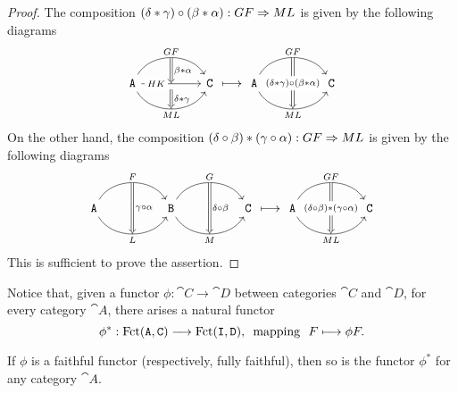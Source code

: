 \begin{proof}
The composition \((\delta * \gamma) \circ (\beta * \alpha): GF \Rightarrow ML\) is
given by the following diagrams
\[
\begin{tikzcd}
\cat A \ar[rr, bend left=60, "GF"{name=GF}]
\ar[rr, "HK"{description, near start}, ""'{name=HK}]
\ar[rr, "ML"'{name=ML}, bend right=60]
& &\cat C
\ar[Rightarrow, "\beta * \alpha", from=GF, to=HK]
\ar[Rightarrow, "\delta* \gamma", from=HK, to=ML]
\end{tikzcd}
\longmapsto
\begin{tikzcd}
\cat A \ar[rr, bend left=60, "GF"{name=GF}]
\ar[rr, "ML"'{name=ML}, bend right=60]
& &\cat C
\ar[Rightarrow, "(\delta * \gamma) \circ (\beta * \alpha)" description, from=GF,
to=ML]
\end{tikzcd}
\]
On the other hand, the composition \((\delta \circ \beta) * (\gamma \circ
\alpha): GF \Rightarrow ML\) is given by the following diagrams
\[
\begin{tikzcd}
\cat A
\ar[rr, "F"{name=F}, bend left=60]
\ar[rr, "L"'{name=L}, bend right=60]
&& \cat B
\ar[rr, "G"{name=G}, bend left=60]
\ar[rr, "M"'{name=M}, bend right=60]
&& \cat C
\ar[Rightarrow, "\gamma \circ \alpha", from=F, to=L]
\ar[Rightarrow, "\delta \circ \beta", from=G, to=M]
\end{tikzcd}
\longmapsto
\begin{tikzcd}
\cat A \ar[rr, bend left=60, "GF"{name=GF}]
\ar[rr, "ML"'{name=ML}, bend right=60]
& &\cat C
\ar[Rightarrow, "(\delta \circ \beta) * (\gamma \circ \alpha)" description,
from=GF, to=ML]
\end{tikzcd}
\]
This is sufficient to prove the assertion.
\end{proof}

Notice that, given a functor \(\phi: \cat C \to \cat D\) between categories
\(\cat C\) and \(\cat D\), for every category \(\cat A\), there arises a natural
functor
\[
  \phi^{*}: \operatorname{Fct}(\texttt A, \texttt C) \longrightarrow \operatorname{Fct}(\texttt I, \texttt D)\text{,}
  \ \text{ mapping }\
  F \longmapsto \phi F.
\]

\begin{lemma}
\label{lem:faithful-pushforward-functor}
If \(\phi\) is a faithful functor (respectively, fully faithful), then so is the
functor \(\phi^{*}\) for any category \(\cat A\).
\end{lemma}

